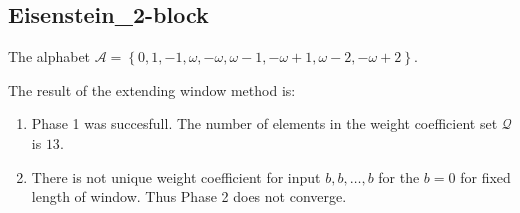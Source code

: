 \subsection{ Eisenstein\_2-block }

\label{subsec:Eisenstein2-block}

The alphabet $\mathcal{A} =\left\{0, 1, -1, \omega, -\omega, \omega - 1, -\omega + 1, \omega - 2, -\omega + 2\right\}$.

\noindent The result of the extending window method is:
\begin{enumerate}
    \item Phase 1 was succesfull.
The number of elements in the weight coefficient set $\mathcal{Q}$ is $13$.

    \item There is not unique weight coefficient for input $b,b,\dots,b$ for the $b= 0 $ for fixed length of window. Thus Phase 2 does not converge.

\end{enumerate}
